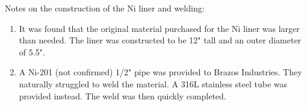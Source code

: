 Notes on the construction of the Ni liner and welding:
\begin{enumerate}
  \item It was found that the original material purchased for the Ni liner was
    larger than needed. The liner was constructed to be 12" tall and
    an outer diameter of 5.5". %
  \item A Ni-201 (not confirmed) 1/2" pipe was provided to Brazos
    Industries. They naturally struggled to weld the material.
    A 316L stainless steel tube was provided instead. The weld was
    then quickly completed.
\end{enumerate}

